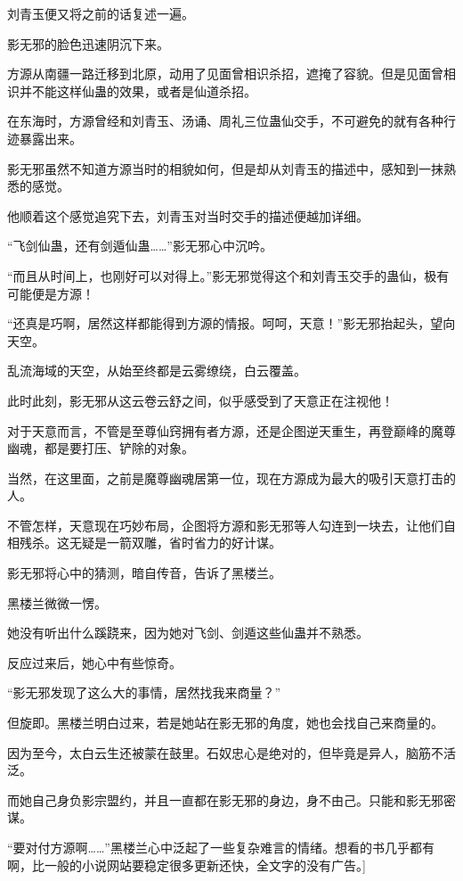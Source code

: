 
\begin{this_body}

刘青玉便又将之前的话复述一遍。

影无邪的脸色迅速阴沉下来。

方源从南疆一路迁移到北原，动用了见面曾相识杀招，遮掩了容貌。但是见面曾相识并不能这样仙蛊的效果，或者是仙道杀招。

在东海时，方源曾经和刘青玉、汤诵、周礼三位蛊仙交手，不可避免的就有各种行迹暴露出来。

影无邪虽然不知道方源当时的相貌如何，但是却从刘青玉的描述中，感知到一抹熟悉的感觉。

他顺着这个感觉追究下去，刘青玉对当时交手的描述便越加详细。

“飞剑仙蛊，还有剑遁仙蛊……”影无邪心中沉吟。

“而且从时间上，也刚好可以对得上。”影无邪觉得这个和刘青玉交手的蛊仙，极有可能便是方源！

“还真是巧啊，居然这样都能得到方源的情报。呵呵，天意！”影无邪抬起头，望向天空。

乱流海域的天空，从始至终都是云雾缭绕，白云覆盖。

此时此刻，影无邪从这云卷云舒之间，似乎感受到了天意正在注视他！

对于天意而言，不管是至尊仙窍拥有者方源，还是企图逆天重生，再登巅峰的魔尊幽魂，都是要打压、铲除的对象。

当然，在这里面，之前是魔尊幽魂居第一位，现在方源成为最大的吸引天意打击的人。

不管怎样，天意现在巧妙布局，企图将方源和影无邪等人勾连到一块去，让他们自相残杀。这无疑是一箭双雕，省时省力的好计谋。

影无邪将心中的猜测，暗自传音，告诉了黑楼兰。

黑楼兰微微一愣。

她没有听出什么蹊跷来，因为她对飞剑、剑遁这些仙蛊并不熟悉。

反应过来后，她心中有些惊奇。

“影无邪发现了这么大的事情，居然找我来商量？”

但旋即。黑楼兰明白过来，若是她站在影无邪的角度，她也会找自己来商量的。

因为至今，太白云生还被蒙在鼓里。石奴忠心是绝对的，但毕竟是异人，脑筋不活泛。

而她自己身负影宗盟约，并且一直都在影无邪的身边，身不由己。只能和影无邪密谋。

“要对付方源啊……”黑楼兰心中泛起了一些复杂难言的情绪。想看的书几乎都有啊，比一般的小说网站要稳定很多更新还快，全文字的没有广告。]


\end{this_body}
